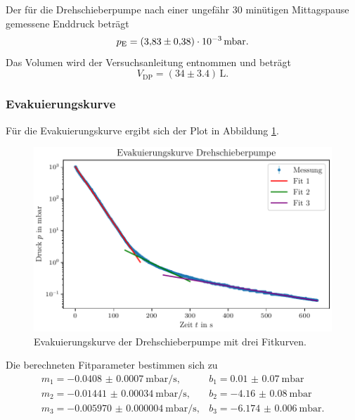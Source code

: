 Der für die Drehschieberpumpe nach einer ungefähr 30 minütigen Mittagspause gemessene Enddruck beträgt
\begin{equation}
    p_\text{E} = (\num{3.83} \pm \num{0.38}) \cdot 10^{-3} \, \si{\milli\bar}.\\
\end{equation}
Das Volumen wird der Versuchsanleitung entnommen und beträgt
\begin{equation}
    V_\text{DP} = (\num{34} \pm \num{3.4}) \, \si{\liter}.
\end{equation}


\subsubsection{Evakuierungskurve}

Für die Evakuierungskurve ergibt sich der Plot in Abbildung \ref{fig:DP_evak}.

\begin{figure}[H]
    \centering
    \includegraphics[width=\textwidth]{plots/DP_Evakuierungskurve.pdf}
    \caption{Evakuierungskurve der Drehschieberpumpe mit drei Fitkurven.}
    \label{fig:DP_evak}
\end{figure}

Die berechneten Fitparameter bestimmen sich zu 
\begin{align}
    m_1 = \qty[separate-uncertainty=false]{-0.0408(7)}{\milli\bar\per\second}, & b_1 = \qty[separate-uncertainty=false]{0.01(7)}{\milli\bar} \\
    m_2 = \qty[separate-uncertainty=false]{-0.01441(34)}{\milli\bar\per\second}, & b_2 = \qty[separate-uncertainty=false]{-4.16(8)}{\milli\bar}\\
    m_3 = \qty[separate-uncertainty=false]{-0.005970(4)}{\milli\bar\per\second}, & b_3 = \qty[separate-uncertainty=false]{-6.174(6)}{\milli\bar}.
\end{align}

